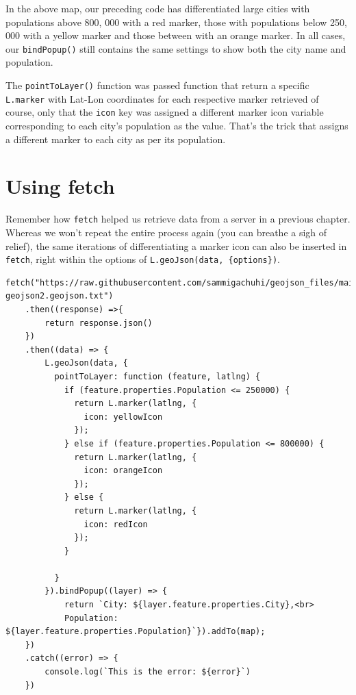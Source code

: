 \documentclass[
]{book}
\begin{document}
In the above map, our preceding code has differentiated large cities with populations above 800, 000 with a red marker, those with populations below 250, 000 with a yellow marker and those between with an orange marker. In all cases, our \texttt{bindPopup()} still contains the same settings to show both the city name and population.

The \texttt{pointToLayer()} function was passed function that return a specific \texttt{L.marker} with Lat-Lon coordinates for each respective marker retrieved of course, only that the \texttt{icon} key was assigned a different marker icon variable corresponding to each city's population as the value. That's the trick that assigns a different marker to each city as per its population.

\hypertarget{using-fetch}{%
\section{Using fetch}\label{using-fetch}}

Remember how \texttt{fetch} helped us retrieve data from a server in a previous chapter. Whereas we won't repeat the entire process again (you can breathe a sigh of relief), the same iterations of differentiating a marker icon can also be inserted in \texttt{fetch}, right within the options of \texttt{L.geoJson(data,\ \{options\})}.

\begin{verbatim}
fetch("https://raw.githubusercontent.com/sammigachuhi/geojson_files/main/cities-geojson2.geojson.txt")
    .then((response) =>{
        return response.json()
    })
    .then((data) => {
        L.geoJson(data, {
          pointToLayer: function (feature, latlng) {
            if (feature.properties.Population <= 250000) {
              return L.marker(latlng, {
                icon: yellowIcon 
              });
            } else if (feature.properties.Population <= 800000) {
              return L.marker(latlng, {
                icon: orangeIcon 
              });
            } else {
              return L.marker(latlng, {
                icon: redIcon 
              });
            }
            
          }
        }).bindPopup((layer) => {
            return `City: ${layer.feature.properties.City},<br>
            Population: ${layer.feature.properties.Population}`}).addTo(map);
    })
    .catch((error) => {
        console.log(`This is the error: ${error}`)
    })
\end{verbatim}
\end{document}
